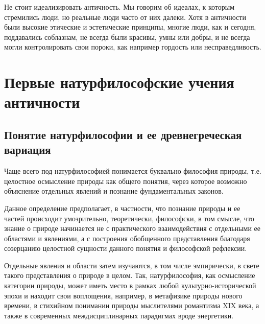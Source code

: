 \begin{enumerate}
\end{enumerate}

Не стоит идеализировать античность. Мы говорим об идеалах, к которым стремились люди, но реальные люди часто от них далеки. Хотя в античности были высокие этические и эстетические принципы, многие люди, как и сегодня, поддавались соблазнам, не всегда были красивы, умны или добры, и не всегда могли контролировать свои пороки, как например гордость или несправедливость.

\section{Первые натурфилософские учения античности}

\subsection{Понятие натурфилософии и ее древнегреческая вариация}
Чаще всего под натурфилософией понимается буквально философия природы, т.е.
целостное осмысление природы как общего понятия, через которое возможно объяснение отдельных явлений и познание фундаментальных законов.

Данное определение предполагает, в частности, что познание природы и ее частей
происходит умозрительно, теоретически, философски, в том смысле, что знание о
природе начинается не с практического взаимодействия с отдельными ее областями и
явлениями, а с построения обобщенного представления благодаря созерцанию
целостной сущности данного понятия и философской рефлексии. 

Отдельные явления и области затем изучаются, в том числе эмпирически, в свете такого представления о природе в целом. Так, натурфилософия, как осмысление категории природы, может иметь место в рамках любой культурно-исторической эпохи и находит свои воплощения, например, в метафизике природы нового времени, в стихийном понимании природы мыслителями романтизма XIX века, а также в современных междисциплинарных парадигмах вроде энергетики. 

